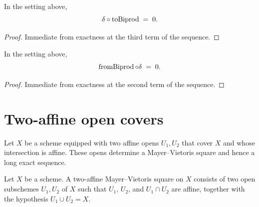 \begin{lemma}\label{mk-lem:Scheme_HModule_prime_delta_toBiprod}
  \leanok


  In the setting above,
  \[
    \delta \circ \operatorname{toBiprod} \;=\; 0.
  \]
\end{lemma}

\begin{proof}
  \leanok

  Immediate from exactness at the third term of the sequence.
\end{proof}

\begin{lemma}\label{mk-lem:Scheme_HModule_prime_fromBiprod_delta}
  \leanok


  In the setting above,
  \[
    \operatorname{fromBiprod} \circ \delta \;=\; 0.
  \]
\end{lemma}

\begin{proof}
  \leanok

  Immediate from exactness at the second term of the sequence.
\end{proof}

\section{Two-affine open covers}
\label{mk-sec:scheme_affineCoverMVSquare}

Let \(X\) be a scheme equipped with two affine opens \(U_1,U_2\) that cover \(X\) and whose intersection is affine. These opens determine a Mayer--Vietoris square and hence a long exact sequence.

\begin{definition}\label{mk-def:Scheme_AffineCoverMVSquare}
  \leanok


  Let \(X\) be a scheme. A two-affine Mayer--Vietoris square on \(X\) consists of two open subschemes \(U_1, U_2\) of \(X\) such that \(U_1\), \(U_2\), and \(U_1 \cap U_2\) are affine, together with the hypothesis \(U_1 \cup U_2 = X\).
\end{definition}

